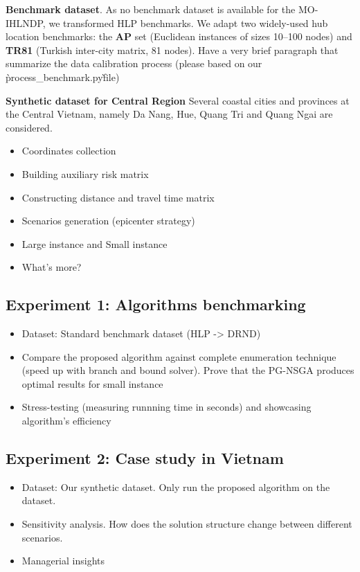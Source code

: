 \documentclass{llncs}
\begin{document}
\textbf{Benchmark dataset}. As no benchmark dataset is available for the MO-IHLNDP, we transformed HLP benchmarks. We adapt two widely-used hub location benchmarks: the \textbf{AP} set \cite{ap_dataset} (Euclidean instances of sizes 10--100 nodes) and \textbf{TR81} \cite{tr81_dataset} (Turkish inter-city matrix, 81 nodes).
Have a very brief paragraph that summarize the data calibration process (please based on our \`process\_benchmark.py\` file)


\textbf{Synthetic dataset for Central Region} Several coastal cities and provinces at the Central Vietnam, namely Da Nang, Hue, Quang Tri and Quang Ngai are considered. 

\begin{itemize}
\item Coordinates collection
\item Building auxiliary risk matrix
\item Constructing distance and travel time matrix
\item Scenarios generation (epicenter strategy)
\item Large instance and Small instance
\item What's more?
\end{itemize}

\subsection{Experiment 1: Algorithms benchmarking}
\begin{itemize}
    \item Dataset: Standard benchmark dataset (HLP -> DRND)
    \item Compare the proposed algorithm against complete enumeration technique (speed up with branch and bound solver). Prove that the PG-NSGA produces optimal results for small instance
    \item Stress-testing (measuring runnning time in seconds) and showcasing algorithm's efficiency 
\end{itemize}

\subsection{Experiment 2: Case study in Vietnam}
\begin{itemize}
    \item Dataset: Our synthetic dataset. Only run the proposed algorithm on the dataset.
    \item Sensitivity analysis. How does the solution structure change between different scenarios.
    \item Managerial insights
\end{itemize}
\end{document}
